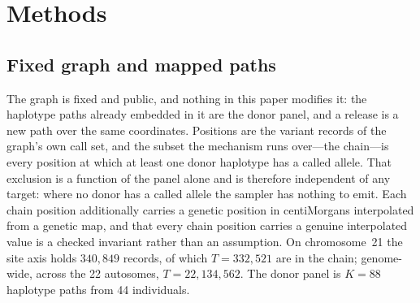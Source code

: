 
\section{Methods}

\subsection{Fixed graph and mapped paths}

The graph is fixed and public, and nothing in this paper modifies it: the haplotype
paths already embedded in it are the donor panel, and a release is a new path over
the same coordinates. Positions are the variant records of the graph's own call set,
and the subset the mechanism runs over---the chain---is every position at which at
least one donor haplotype has a called allele. That exclusion is a function of the
panel alone and is therefore independent of any target: where no donor has a called
allele the sampler has nothing to emit. Each chain position additionally carries a
genetic position in centiMorgans interpolated from a genetic map, and that every
chain position carries a genuine interpolated value is a checked invariant rather
than an assumption. On chromosome~21 the site axis holds $340{,}849$ records, of
which $T = 332{,}521$ are in the chain; genome-wide, across the 22 autosomes,
$T = 22{,}134{,}562$. The donor panel is $K = 88$ haplotype paths from 44
individuals.

